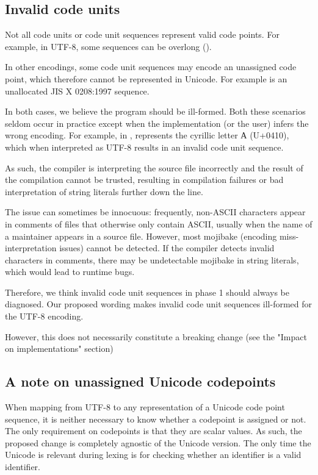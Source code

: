 \documentclass{wg21}
\begin{document}
\subsection{Invalid code units}

Not all code units or code unit sequences represent valid code points.
For example, in UTF-8, some sequences can be overlong ().

In other encodings, some code unit sequences may encode an unassigned code point, which therefore cannot be represented in Unicode.
For example  is an unallocated JIS X 0208:1997 sequence.

In both cases, we believe the program should be ill-formed.
Both these scenarios seldom occur in practice except when the implementation (or the user) infers the wrong encoding.
For example, in ,  represents the cyrillic letter А (U+0410), which when interpreted
as UTF-8 results in an invalid code unit sequence.

As such, the compiler is interpreting the source file incorrectly and the result of the compilation cannot be trusted,
resulting in compilation failures or bad interpretation of string literals further down the line.

The issue can sometimes be innocuous:
frequently, non-ASCII characters appear in comments of files that otherwise only contain ASCII, usually when the name of
a maintainer appears in a source file.
However, most mojibake (encoding miss-interpretation issues) cannot be detected. If the compiler detects invalid characters in comments, there may be undetectable
mojibake in string literals, which would lead to runtime bugs.

Therefore, we think invalid code unit sequences in phase 1 should always be diagnosed.
Our proposed wording makes invalid code unit sequences ill-formed for the UTF-8 encoding.

However, this does not necessarily constitute a breaking change (see the "Impact on implementations" section)

\subsection{A note on unassigned Unicode codepoints}

When mapping from UTF-8 to any representation of a Unicode code point sequence, it is neither necessary to know
whether a codepoint is assigned or not.
The only requirement on codepoints is that they are scalar values.
As such, the proposed change is completely agnostic of the Unicode version.
The only time the Unicode is relevant during lexing is for checking whether an identifier is a valid identifier.
\end{document}
